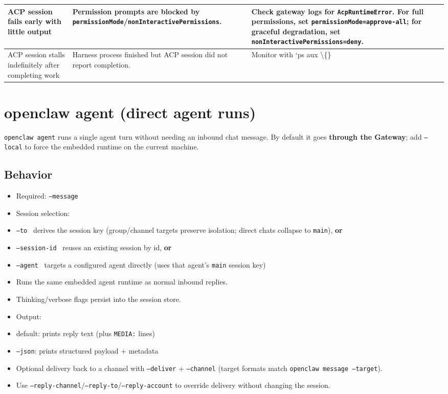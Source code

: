 \begin{table}[h]
\begin{tabular}{|l|l|l|}
\hline
ACP session fails early with little output & Permission prompts are blocked by \texttt{permissionMode}/\texttt{nonInteractivePermissions}. & Check gateway logs for \texttt{AcpRuntimeError}. For full permissions, set \texttt{permissionMode=approve-all}; for graceful degradation, set \texttt{nonInteractivePermissions=deny}. \\
\hline
ACP session stalls indefinitely after completing work & Harness process finished but ACP session did not report completion. & Monitor with `ps aux \textbackslash\{\} \\
\hline
\end{tabular}
\end{table}




\clearpage

\section{openclaw agent (direct agent runs)}


\texttt{openclaw agent} runs a single agent turn without needing an inbound chat message.
By default it goes \textbf{through the Gateway}; add \texttt{--local} to force the embedded
runtime on the current machine.

\subsection{Behavior}


\begin{itemize}
  \item Required: \texttt{--message }
  \item Session selection:
  \item \texttt{--to } derives the session key (group/channel targets preserve isolation; direct chats collapse to \texttt{main}), \textbf{or}
  \item \texttt{--session-id } reuses an existing session by id, \textbf{or}
  \item \texttt{--agent } targets a configured agent directly (uses that agent's \texttt{main} session key)
  \item Runs the same embedded agent runtime as normal inbound replies.
  \item Thinking/verbose flags persist into the session store.
  \item Output:
  \item default: prints reply text (plus \texttt{MEDIA:} lines)
  \item \texttt{--json}: prints structured payload + metadata
  \item Optional delivery back to a channel with \texttt{--deliver} + \texttt{--channel} (target formats match \texttt{openclaw message --target}).
  \item Use \texttt{--reply-channel}/\texttt{--reply-to}/\texttt{--reply-account} to override delivery without changing the session.
\end{itemize}


